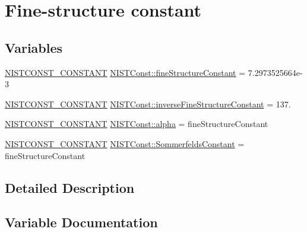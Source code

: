 \hypertarget{group___n_i_s_t_const-_fine_structure_constant}{}\section{Fine-\/structure constant}
\label{group___n_i_s_t_const-_fine_structure_constant}
\subsection*{Variables}
\begin{DoxyCompactItemize}
\item 
\mbox{\hyperlink{group___n_i_s_t_const-_macros_ga2b0fc1d7452373f816175dd86ce26729}{N\+I\+S\+T\+C\+O\+N\+S\+T\+\_\+\+C\+O\+N\+S\+T\+A\+NT}} \mbox{\hyperlink{group___n_i_s_t_const-_fine_structure_constant_ga67cf20054caf1e81add883470b89db51}{N\+I\+S\+T\+Const\+::fine\+Structure\+Constant}} = 7.\+2973525664e-\/3
\item 
\mbox{\hyperlink{group___n_i_s_t_const-_macros_ga2b0fc1d7452373f816175dd86ce26729}{N\+I\+S\+T\+C\+O\+N\+S\+T\+\_\+\+C\+O\+N\+S\+T\+A\+NT}} \mbox{\hyperlink{group___n_i_s_t_const-_fine_structure_constant_gab0b66cc7e11797dce82219a024123a12}{N\+I\+S\+T\+Const\+::inverse\+Fine\+Structure\+Constant}} = 137.
\item 
\mbox{\hyperlink{group___n_i_s_t_const-_macros_ga2b0fc1d7452373f816175dd86ce26729}{N\+I\+S\+T\+C\+O\+N\+S\+T\+\_\+\+C\+O\+N\+S\+T\+A\+NT}} \mbox{\hyperlink{group___n_i_s_t_const-_fine_structure_constant_ga77b492426a2fa05468529186938c71b3}{N\+I\+S\+T\+Const\+::alpha}} = fine\+Structure\+Constant
\item 
\mbox{\hyperlink{group___n_i_s_t_const-_macros_ga2b0fc1d7452373f816175dd86ce26729}{N\+I\+S\+T\+C\+O\+N\+S\+T\+\_\+\+C\+O\+N\+S\+T\+A\+NT}} \mbox{\hyperlink{group___n_i_s_t_const-_fine_structure_constant_gaf9df05adb001bf4c783b115a02ce2d80}{N\+I\+S\+T\+Const\+::\+Sommerfelds\+Constant}} = fine\+Structure\+Constant
\end{DoxyCompactItemize}


\subsection{Detailed Description}


\subsection{Variable Documentation}
\mbox{\label{group___n_i_s_t_const-_fine_structure_constant_ga77b492426a2fa05468529186938c71b3}} 
